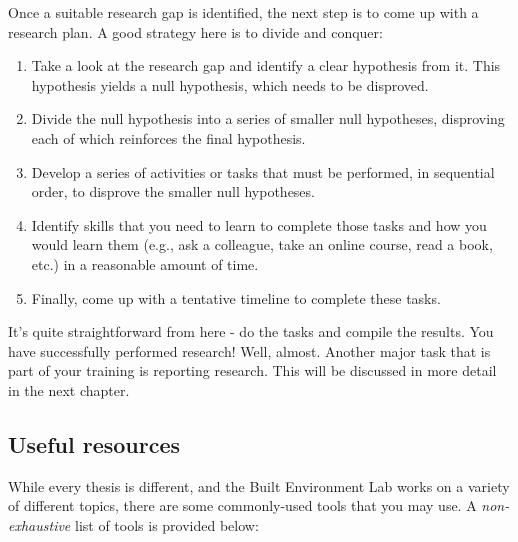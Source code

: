 \documentclass[12pt]{article}
\begin{document}
Once a suitable research gap is identified, the next step is to come up with a research plan. A good strategy here is to divide and conquer:

\begin{enumerate}
	\item Take a look at the research gap and identify a clear hypothesis from it. This hypothesis yields a null hypothesis, which needs to be disproved.
	\item Divide the null hypothesis into a series of smaller null hypotheses, disproving each of which reinforces the final hypothesis.
	\item Develop a series of activities or tasks that must be performed, in sequential order, to disprove the smaller null hypotheses. 
	\item Identify skills that you need to learn to complete those tasks and how you would learn them (e.g., ask a colleague, take an online course, read a book, etc.) in a reasonable amount of time.
	\item Finally, come up with a tentative timeline to complete these tasks.
\end{enumerate}

It's quite straightforward from here - do the tasks and compile the results. You have successfully performed research! Well, almost. Another major task that is part of your training is reporting research. This will be discussed in more detail in the next chapter.

\subsection{Useful resources}
While every thesis is different, and the Built Environment Lab works on a variety of different topics, there are some commonly-used tools that you may use. A \textit{non-exhaustive} list of tools is provided below:
\end{document}
